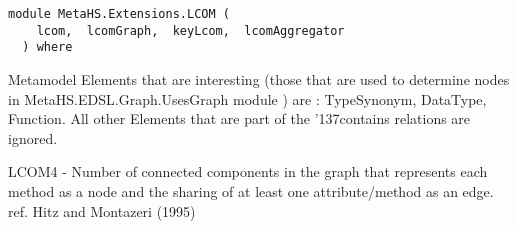 \label{module:MetaHS.Extensions.LCOM}
\haddockbeginheader
{\haddockverb\begin{verbatim}
module MetaHS.Extensions.LCOM (
    lcom,  lcomGraph,  keyLcom,  lcomAggregator
  ) where\end{verbatim}}
\haddockendheader

Metamodel Elements that are interesting (those that are used to determine nodes in
MetaHS.EDSL.Graph.UsesGraph module ) are : TypeSynonym, DataType, Function.
All other Elements that are  part of the {\char '137}contains relations are ignored.\par
LCOM4 - Number of connected components in the graph that represents each method as a node and the sharing of at least
        one attribute/method as an edge.
        ref. Hitz and Montazeri (1995)\par

